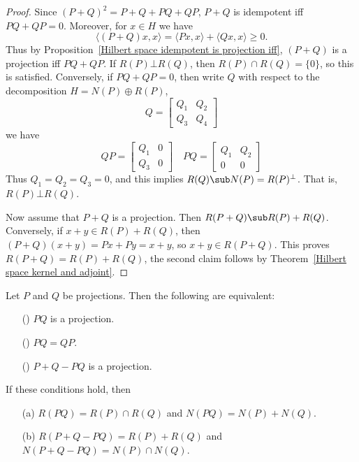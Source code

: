 \begin{proof}
Since $(P+Q)^2=P+Q+PQ+QP$, $P+Q$ is idempotent iff $PQ+QP=0$. Moreover, for $x\in H$ we have
\[\langle(P+Q)x,x\rangle=\langle Px,x\rangle+\langle Qx,x\rangle\geq 0.\]
Thus by Proposition~\ref{Hilbert space idempotent is projection iff}, $(P+Q)$ is a projection iff $PQ+QP$. If $R(P)\bot R(Q)$, then $R(P)\cap R(Q)=\{0\}$, so this is satisfied. Conversely, if $PQ+QP=0$, then write $Q$ with respect to the decomposition $H=N(P)\oplus R(P)$,
\[Q=\begin{bmatrix}
Q_1&Q_2\\
Q_3&Q_4
\end{bmatrix}\]
we have
\[QP=\begin{bmatrix}
Q_1&0\\
Q_3&0
\end{bmatrix}\quad PQ=\begin{bmatrix}
Q_1&Q_2\\
0&0
\end{bmatrix}\]
Thus $Q_1=Q_2=Q_3=0$, and this implies $R(Q)\sub N(P)=R(P)^\bot$. That is, $R(P)\bot R(Q)$.\par
Now assume that $P+Q$ is a projection. Then $R(P+Q)\sub R(P)+R(Q)$. Conversely, if $x+y\in R(P)+R(Q)$, then $(P+Q)(x+y)=Px+Py=x+y$, so $x+y\in R(P+Q)$. This proves $R(P+Q)=R(P)+R(Q)$, the second claim follows by Theorem~\ref{Hilbert space kernel and adjoint}.
\end{proof}
\begin{proposition}\label{Hilbert space composition of projection}
Let $P$ and $Q$ be projections. Then the following are equivalent:
\begin{itemize}
\item[(\rmnum{1})] $PQ$ is a projection.
\item[(\rmnum{2})] $PQ=QP$.
\item[(\rmnum{3})] $P+Q-PQ$ is a projection.
\end{itemize}
If these conditions hold, then
\begin{itemize}
\item[(a)] $R(PQ)=R(P)\cap R(Q)$ and $N(PQ)=N(P)+N(Q)$.
\item[(b)] $R(P+Q-PQ)=R(P)+R(Q)$ and $N(P+Q-PQ)=N(P)\cap N(Q)$. 
\end{itemize}
\end{proposition}
